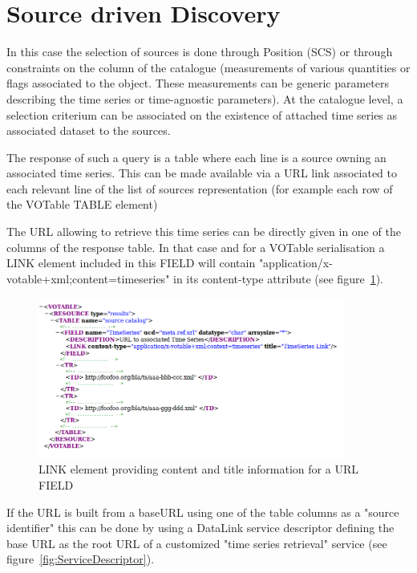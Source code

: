 \documentclass[11pt,a4paper]{ivoa}
\begin{document}
\section{Source driven Discovery}
\label{sec:source}
       In this case the selection of sources is done through Position (SCS) or through constraints on the column of the catalogue (measurements of  various quantities  or flags associated to the object. These measurements can be generic parameters describing the time series or time-agnostic parameters). At the catalogue level, a selection criterium can be associated on the existence of attached time series as associated dataset to the sources. 


        The response of such a query is a table where each line is a source owning an associated time series.
This can be made available via a URL link associated to each relevant line of the list of sources representation (for example each row of the VOTable TABLE element) 


       The URL allowing to retrieve this time series can be directly given in one of the columns of the response table. In that case and for a VOTable serialisation a LINK element included in this FIELD will contain "application/x-votable+xml;content=timeseries" in its content-type attribute (see figure~\ref{fig:Link}).

\begin{figure}
\centering

\includegraphics[width=0.9\textwidth]{Link.png}
\caption{LINK element providing content and title information for a URL FIELD}
\label{fig:Link}
\end{figure}


        If the URL is built from a baseURL using one of the table columns  as a "source identifier" this can be done by using a DataLink service descriptor \citep{2015ivoa.spec.0617D} defining the base URL as the root URL of a customized "time series retrieval" service (see figure~\ref{fig:ServiceDescriptor}).
\end{document}
